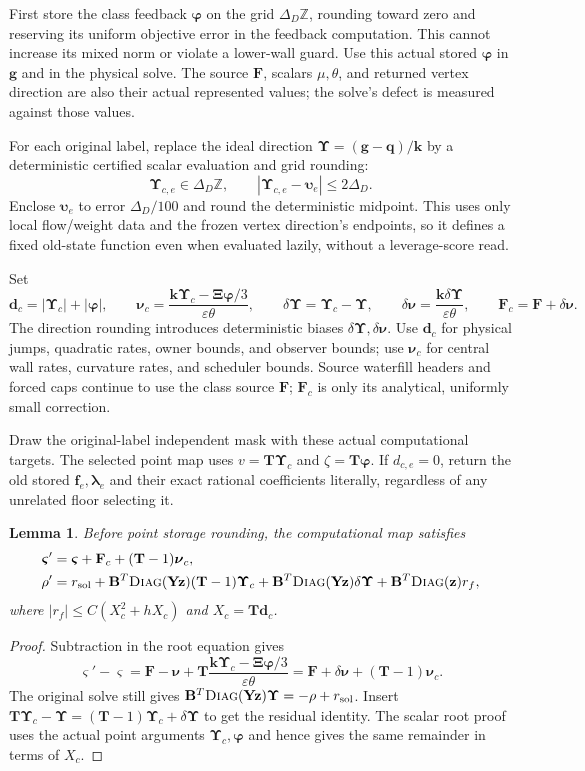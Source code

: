 \documentclass[11pt]{article}
\newtheorem{lemma}[theorem]{Lemma}
\theoremstyle{remark}
\newcommand{\BB}{\mathbf B}
\newcommand{\ff}{\mathbf f}
\newcommand{\llambda}{\boldsymbol{\lambda}}
\newcommand{\zz}{\mathbf z}
\newcommand{\vvs}{\boldsymbol{\varsigma}}
\newcommand{\vvu}{\boldsymbol{\upsilon}}
\newcommand{\XXi}{\boldsymbol{\Xi}}
\newcommand{\UUps}{\boldsymbol{\Upsilon}}
\newcommand{\YY}{\mathbf Y}
\newcommand{\FF}{\mathbf F}
\newcommand{\TT}{\mathbf T}
\renewcommand{\gg}{\mathbf g}
\newcommand{\qq}{\mathbf q}
\newcommand{\kk}{\mathbf k}
\newcommand{\dd}{\mathbf d}
\newcommand{\nnu}{\boldsymbol{\nu}}
\newcommand{\pphi}{\boldsymbol{\varphi}}
\newcommand{\diag}{\textsc{Diag}}
\begin{document}
First store the class feedback $\pphi$ on the grid $\Delta_D\mathbb Z$,
rounding toward zero and reserving its uniform objective error in the feedback
computation.
This cannot increase its mixed norm or violate a lower-wall guard.
Use this actual stored $\pphi$ in $\gg$ and in the physical solve.
The source $\FF$, scalars $\mu,\theta$, and returned vertex direction are also
their actual represented values; the solve's defect is measured against those
values.

For each original label, replace the ideal direction $\UUps=(\gg-\qq)/\kk$ by a
deterministic certified scalar evaluation and grid rounding:
\[
 \UUps_{c,e}\in\Delta_D\mathbb Z,\qquad
 |\UUps_{c,e}-\vvu_e|\le2\Delta_D.
\]
Enclose $\vvu_e$ to error $\Delta_D/100$ and round the deterministic midpoint.
This uses only local flow/weight data and the frozen vertex direction's
endpoints, so it defines a fixed old-state function even when evaluated lazily,
without a leverage-score read.

Set
\[
 \dd_c=|\UUps_c|+|\pphi|,\qquad
 \nnu_c=\frac{\kk \UUps_c-\XXi\pphi/3}{\varepsilon\theta},\qquad
 \delta \UUps=\UUps_c-\UUps,\qquad
 \delta\nnu=\frac{\kk\delta \UUps}{\varepsilon\theta},\qquad
 \FF_c=\FF+\delta\nnu.
\]
The direction rounding introduces deterministic biases $\delta \UUps,\delta\nnu$.
Use $\dd_c$ for physical jumps, quadratic rates, owner bounds, and observer
bounds; use $\nnu_c$ for central wall rates, curvature rates, and scheduler
bounds.
Source waterfill headers and forced caps continue to use the class source $\FF$;
$\FF_c$ is only its analytical, uniformly small correction.

Draw the original-label independent mask with these actual computational
targets.
The selected point map uses $v=\TT \UUps_c$ and $\zeta=\TT\pphi$.
If $d_{c,e}=0$, return the old stored $\ff_e,\llambda_e$ and their exact rational
coefficients literally, regardless of any unrelated floor selecting it.

\begin{lemma}
\label{lem:ram-computational-identities}
Before point storage rounding, the computational map satisfies
\begin{align*}
 \vvs'&=\vvs+\FF_c+(\TT-1)\nnu_c,\\
 \rho'&=r_{\rm sol}
       +\BB^T\diag(\YY\zz)(\TT-1)\UUps_c
       +\BB^T\diag(\YY\zz)\delta \UUps
       +\BB^T\diag(\zz)r_f,
\end{align*}
where $|r_f|\le C(X_c^2+hX_c)$ and $X_c=\TT \dd_c$.
\end{lemma} \begin{proof} Subtraction in the root equation gives
\[
 \vvs'-\vvs=\FF-\nnu+\TT\frac{\kk \UUps_c-\XXi\pphi/3}{\varepsilon\theta}
       =\FF+\delta\nnu+(\TT-1)\nnu_c.
\]
The original solve still gives $\BB^T\diag(\YY\zz)\UUps=-\rho+r_{\rm sol}$.
Insert $\TT \UUps_c-\UUps=(\TT-1)\UUps_c+\delta \UUps$ to get the residual identity.
The scalar root proof uses the actual point arguments $\UUps_c,\pphi$ and hence
gives the same remainder in terms of $X_c$.
\end{proof}
\end{document}
